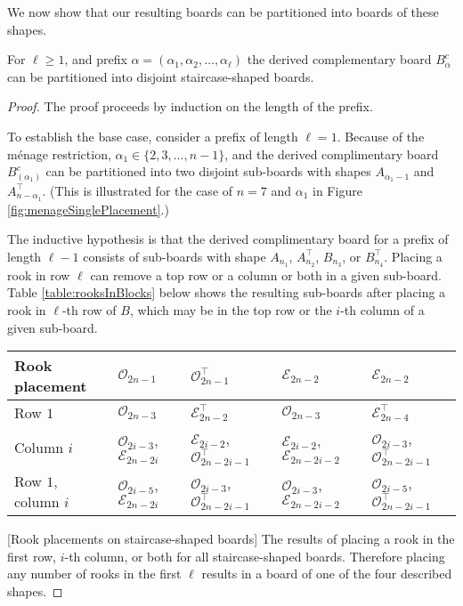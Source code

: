 We now show that our resulting boards can be partitioned into boards of these shapes.

\begin{lemma}
  For $\ell \geq 1$, and prefix $\alpha = (\alpha_1, \alpha_2, \dots, \alpha_\ell)$
  the derived complementary board $B_\alpha^c$ can be partitioned into
  disjoint staircase-shaped boards.
  \label{lemma:boardShape}
\end{lemma}
\begin{proof}
  The proof proceeds by induction on the length of the prefix.

  To establish the base case, consider a prefix of length $\ell = 1$.
  Because of the m\'enage restriction,
  $\alpha_1 \in \{2, 3, \dots, n-1\}$, and
  the derived complimentary board $B_{(\alpha_1)}^c$
  can be partitioned into two disjoint sub-boards with shapes
  $A_{\alpha_1 - 1}$ and $A^\intercal_{n - \alpha_1}$.
  (This is illustrated for the case of $n = 7$ and $\alpha_1$ in
  Figure \ref{fig:menageSinglePlacement}.)

  The inductive hypothesis is that the derived complimentary board for
  a prefix of length $\ell - 1$ consists of sub-boards with shape
  $A_{n_1}$, $A^\intercal_{n_2}$, $B_{n_3}$, or $B^\intercal_{n_4}$.
  Placing a rook in row $\ell$ can remove a top row or a column or both in a
  given sub-board.
  Table \ref{table:rooksInBlocks} below
  shows the resulting sub-boards after placing a rook in
  $\ell$-th row of $B$,
  which may be in the top row or the $i$-th column of a given sub-board.
  \captionsetup{type=table}
  \begin{tabular}{|l|l|l|l|l|}
  \hline
  Rook placement
    & $\mathcal{O}_{2n-1}$
    & $\mathcal{O}_{2n-1}^\intercal$
    & $\mathcal{E}_{2n-2}$
    & $\mathcal{E}_{2n-2}$
  \\ \hline
  Row $1$
    & $\mathcal{O}_{2n-3}$
    & $\mathcal{E}_{2n-2}^\intercal$
    & $\mathcal{O}_{2n-3}$
    & $\mathcal{E}_{2n-4}^\intercal$
  \\
  Column $i$
    & $\mathcal{O}_{2i-3}$, $\mathcal{E}_{2n-2i}$
    & $\mathcal{E}_{2i-2}$, $\mathcal{O}_{2n-2i-1}^\intercal$
    & $\mathcal{E}_{2i-2}$, $\mathcal{E}_{2n-2i-2}$
    & $\mathcal{O}_{2i-3}$, $\mathcal{O}_{2n-2i-1}^\intercal$
  \\
  Row $1$, column $i$
    & $\mathcal{O}_{2i-5}$, $\mathcal{E}_{2n-2i}$
    & $\mathcal{O}_{2i-3}$, $\mathcal{O}_{2n-2i-1}^\intercal$
    & $\mathcal{O}_{2i-3}$, $\mathcal{E}_{2n-2i-2}$
    & $\mathcal{O}_{2i-5}$, $\mathcal{O}_{2n-2i-1}^\intercal$
  \\ \hline
  \end{tabular}
  [Rook placements on staircase-shaped boards]{
    The results of placing a rook in the first row, $i$-th column, or both
    for all staircase-shaped boards.
  }
  \label{table:rooksInBlocks}
  Therefore placing any number of rooks in the first $\ell$ results in a board
  of one of the four described shapes.
\end{proof}

